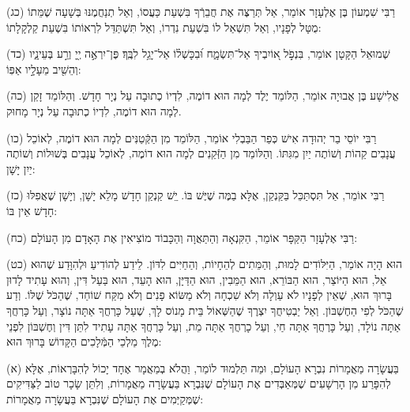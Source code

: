 \documentclass[twoside, openany, parskip=half, 11pt]{book}
\begin{document}
(כג)
רַבִּי שִׁמְעוֹן בֶּן אֶלְעָזָר אוֹמֵר, אַל תְּרַצֶּה אֶת חֲבֵרְֿךָ בִּשְׁעַת כַּעֲסוֹ,
וְאַל תְנַחֲמֶנּוּ בְּשָׁעָה שֶׁמֵּתוֹ מֻטָּל לְפָנָיו,
וְאַל תִּשְׁאַל לוֹ בִּשְׁעַת נִדְרוֹ,
וְאַל תִּשְׁתַּדֵּל לִרְאוֹתוֹ בִּשְׁעַת קַלְקָלָתוֹ:

(כד)
שְׁמוּאֵל הַקָּטָן אוֹמֵר, בִּנְפֹ֣ל א֭וֹיִבְיךָ אַל־תִּשְׂמָ֑ח וּ֝בִכָּשְׁל֗וֹ אַל־יָגֵ֥ל לִבֶּֽךָ׃ פֶּן־יִרְאֶ֣ה יְ֖יָ וְרַ֣ע בְּעֵינָ֑יו וְהֵשִׁ֖יב מֵעָלָ֣יו אַפּֽוֹ:

(כה)
אֱלִישָׁע בֶּן אֲבוּיָה אוֹמֵר, הַלּוֹמֵד יֶלֶד לְמָה הוּא דוֹמֶה, לִדְיוֹ כְתוּבָה עַל נְיָר חָדָשׁ.
וְהַלּוֹמֵד זָקֵן לְמָה הוּא דוֹמֶה, לִדְיוֹ כְתוּבָה עַל נְיָר מָחוּק.

(כו)
רַבִּי יוֹסֵי בַר יְהוּדָה אִישׁ כְּפַר הַבַּבְלִי אוֹמֵר, הַלּוֹמֵד מִן הַקְּֿטַנִּים לְמָה הוּא דוֹמֶה, לְאוֹכֵל עֲנָבִים קֵהוֹת וְשׁוֹתֶה יַיִן מִגִּתּוֹ.
וְהַלּוֹמֵד מִן הַזְּֿקֵנִים לְמָה הוּא דוֹמֶה, לְאוֹכֵל עֲנָבִים בְּשׁוּלוֹת וְשׁוֹתֶה יַיִן יָשָׁן:

(כז)
רַבִּי אוֹמֵר, אַל תִּסְתַּכֵּל בַּקַּנְקַן, אֶלָּא בַמֶּה שֶׁיֶּשׁ בּוֹ. יִֵשׁ קַנְקַן חָדָשׁ מָלֵא יָשָׁן, וְיָשָׁן שֶׁאֲפִלּוּ חָדָשׁ אֵין בּוֹ:

(כח)
רַבִּי אֶלְעָזָר הַקַּפָּר אוֹמֵר, הַקִּנְאָה וְהַתַּאֲוָה וְהַכָּבוֹד מוֹצִיאִין אֶת הָאָדָם מִן הָעוֹלָם:

(כט)
הוּא הָיָה אוֹמֵר, הַיִּלּוֹדִים לָמוּת,
וְהַמֵּתִים לְהֵחָיוֹת,
וְהַחַיִּים לִדּוֹן.
לֵידַע לְהוֹדִיעַ וּלְהִוָּדַע שֶׁהוּא אֵל, הוּא הַיּוֹצֵר, הוּא הַבּוֹרֵא, הוּא הַמֵּבִין, הוּא הַדַּיָּן, הוּא הָעֵד, הוּא בַּעַל דִּין, וְהוּא עָתִיד לָדוּן בָּרוּךְ הוּא, שֶׁאֵין לְפָנָיו לֹא עַוְלָה וְלֹא שִׁכְחָה וְלֹא מַשּׂוֹא פָנִים וְלֹא מִקַּח שׁוֹחַד, שֶׁהַכֹּל שֶׁלּוֹ.
וְדַע שֶׁהַכֹּל לְפִי הַחֶשְׁבּוֹן.
וְאַל יַבְטִיחֲךָ יִצְרֶךָ שֶׁהַשְּׁאוֹל בֵּית מָנוֹס לָךְ, שֶׁעַל כָּרְחֲךָ אַתָּה נוֹצָר,
וְעַל כָּרְחֲךָ אַתָּה נוֹלָד,
וְעַל כָּרְחֲךָ אַתָּה חַי,
וְעַל כָרְחֲךָ אַתָּה מֵת,
וְעַל כָּרְחֲךָ אַתָּה עָתִיד לִתֵּן דִּין וְחֶשְׁבּוֹן לִפְנֵי מֶלֶךְ מַלְכֵי הַמְּֿלָכִים הַקָּדוֹשׁ בָּרוּךְ הוּא:




\kolyisroel

(א)
 בַּעֲשָׂרָה מַאֲמָרוֹת נִבְרָא הָעוֹלָם, וּמַה תַּלְמוּד לוֹמַר, וַהֲלֹא בְמַאֲמָר אֶחָד יָכוֹל לְהִבָּרְאוֹת, אֶלָּא לְהִפָּרַע מִן הָרְשָׁעִים שֶׁמְּאַבְּדִים אֶת הָעוֹלָם שֶׁנִּבְרָא בַּעֲשָׂרָה מַאֲמָרוֹת, וְלִתֵּן שָׂכָר טוֹב לַצַּדִּיקִים שֶׁמְּקַיְּמִים אֶת הָעוֹלָם שֶׁנִּבְרָא בַּעֲשָׂרָה מַאֲמָרוֹת:
\end{document}
